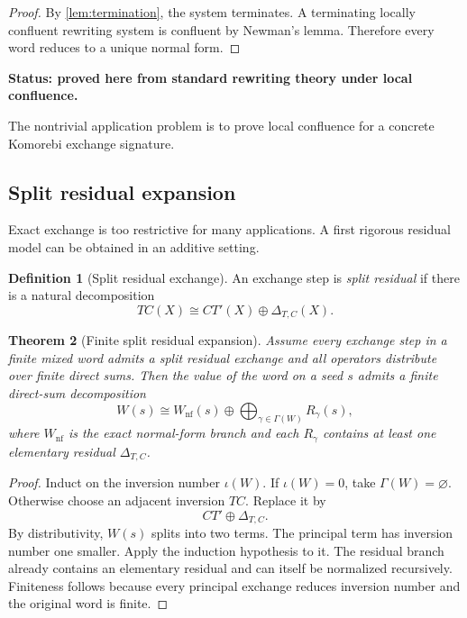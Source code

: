 \documentclass[11pt]{article}
\newtheorem{theorem}{Theorem}[section]
\theoremstyle{definition}
\newtheorem{definition}[theorem]{Definition}
\theoremstyle{remark}
\newcommand{\status}[1]{\textbf{Status: #1.}}
\begin{document}
\begin{proof}
By \cref{lem:termination}, the system terminates. A terminating locally confluent rewriting system is confluent by Newman's lemma. Therefore every word reduces to a unique normal form.
\end{proof}

\status{proved here from standard rewriting theory under local confluence}

The nontrivial application problem is to prove local confluence for a concrete Komorebi exchange signature.

\subsection{Split residual expansion}

Exact exchange is too restrictive for many applications. A first rigorous residual model can be obtained in an additive setting.

\begin{definition}[Split residual exchange]
An exchange step is \emph{split residual} if there is a natural decomposition
\[
TC(X)\cong CT'(X)\oplus\Delta_{T,C}(X).
\]
\end{definition}

\begin{theorem}[Finite split residual expansion]\label{thm:split-expansion}
Assume every exchange step in a finite mixed word admits a split residual exchange and all operators distribute over finite direct sums. Then the value of the word on a seed $s$ admits a finite direct-sum decomposition
\[
W(s)
\cong
W_{\mathrm{nf}}(s)
\oplus
\bigoplus_{\gamma\in\Gamma(W)}R_\gamma(s),
\]
where $W_{\mathrm{nf}}$ is the exact normal-form branch and each $R_\gamma$ contains at least one elementary residual $\Delta_{T,C}$.
\end{theorem}

\begin{proof}
Induct on the inversion number $\iota(W)$. If $\iota(W)=0$, take $\Gamma(W)=\varnothing$. Otherwise choose an adjacent inversion $TC$. Replace it by
\[
CT'\oplus\Delta_{T,C}.
\]
By distributivity, $W(s)$ splits into two terms. The principal term has inversion number one smaller. Apply the induction hypothesis to it. The residual branch already contains an elementary residual and can itself be normalized recursively. Finiteness follows because every principal exchange reduces inversion number and the original word is finite.
\end{proof}
\end{document}

